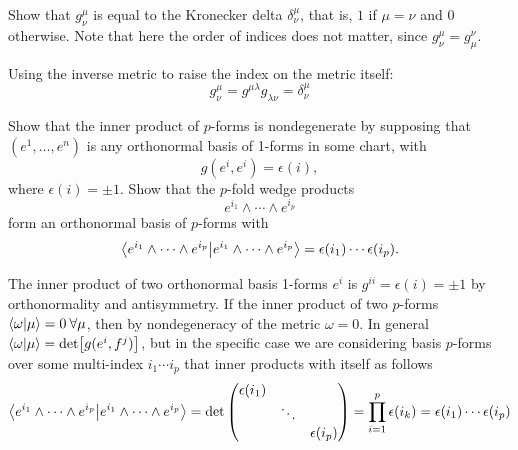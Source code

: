 \documentclass[10pt]{article}
\begin{document}
\begin{example}
	Show that $g^\mu_\nu$ is equal to the Kronecker delta $\delta^\mu_\nu$, that is, $1$ if $\mu=\nu$ and $0$ otherwise. Note that here the order of indices does not matter, since $g^\mu_\nu = g^\nu_\mu$.
\end{example}
\sol Using the inverse metric to raise the index on the metric itself:
$$
g^\mu_\nu = g^{\mu\lambda} g_{\lambda\nu} = \delta^\mu_\nu
$$


\begin{example}\label{b1e57}
	Show that the inner product of $p$-forms is nondegenerate by supposing that $(e^1,\dots,e^n)$ is any orthonormal basis of 1-forms in some chart, with
	$$
		g(e^i,e^i) = \epsilon(i),
	$$
	where $\epsilon(i) = \pm 1$. Show that the $p$-fold wedge products
	$$
		e^{i_1} \wedge \cdots \wedge e^{i_p}
	$$
	form an orthonormal basis of $p$-forms with
	$$
		\ip{e^{i_1} \wedge \cdots \wedge e^{i_p}} = \epsilon(i_1)\cdots \epsilon(i_p).
	$$
\end{example}
\sol The inner product of two orthonormal basis 1-forms $e^i$ is $g^{ii} = \epsilon(i) = \pm 1$ by orthonormality and antisymmetry. If the inner product of two $p$-forms $\ip{\omega}{\mu} = 0\: \forall \mu$, then by nondegeneracy of the metric $\omega = 0$. In general $\ip{\omega}{\mu} = \det[g(e^i,f^j)]$, but in the specific case we are considering basis $p$-forms over some multi-index $i_1 \cdots i_p$ that inner products with itself as follows
$$
\ip{e^{i_1} \wedge \cdots \wedge e^{i_p}} = \det\begin{pmatrix}
	\epsilon(i_1)&&\\
	&\ddots&\\
	&&\epsilon(i_p)
\end{pmatrix} = \prod_{i=1}^{p} \epsilon(i_k) = \epsilon(i_1)\cdots \epsilon(i_p)
$$
\end{document}
